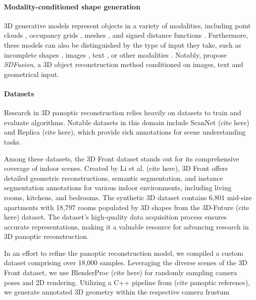 \paragraph{Modality-conditioned shape generation}
3D generative models represent objects in a variety of modalities, including point clouds \citep{achlioptas2018learning, luo2021diffusion}, occupancy grids \citep{mescheder2019occupancy}, meshes \citep{mo2019structurenet}, and signed distance functions \citep{park2019deepsdf}.
Furthermore, these models can also be distinguished by the type of input they take, such as incomplete shapes \citep{dai2017shape}, images \citep{fan2017point}, text \citep{liu2022towards, zhao2023michelangelo}, or other modalities \citep{Zhou_2021_CVPR}. 
Notably, \citet{cheng2023sdfusion} propose \emph{SDFusion}, a 3D object reconstruction method conditioned on images, text and geometrical input.

\paragraph{Datasets}
Research in 3D panoptic reconstruction relies heavily on datasets to train and evaluate algorithms. Notable datasets in this domain include ScanNet (cite here) and Replica (cite here), which provide rich annotations for scene understanding tasks.

Among these datasets, the 3D Front dataset stands out for its comprehensive coverage of indoor scenes. Created by Li et al. (cite here), 3D Front offers detailed geometric reconstructions, semantic segmentation, and instance segmentation annotations for various indoor environments, including living rooms, kitchens, and bedrooms.
The synthetic 3D dataset contains 6,801 mid-size apartments with 18,797 rooms populated by 3D shapes from the 3D-Future (cite here) dataset. The dataset's high-quality data acquisition process ensures accurate representations, making it a valuable resource for advancing research in 3D panoptic reconstruction.

In an effort to refine the panoptic reconstruction model, we compiled a custom dataset comprising over 18,000 samples. Leveraging the diverse scenes of the 3D Front dataset, we use BlenderProc (cite here) for randomly sampling camera poses and 2D rendering. Utilizing a C++ pipeline from (cite panoptic reference), we generate annotated 3D geometry within the respective camera frustum